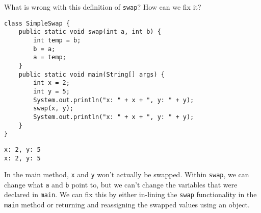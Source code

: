 \question What is wrong with this definition of \texttt{swap}? How can we fix it?

\begin{lstlisting}
class SimpleSwap {
    public static void swap(int a, int b) {
        int temp = b;
        b = a;
        a = temp;
    }
    public static void main(String[] args) {
        int x = 2;
        int y = 5;
        System.out.println("x: " + x + ", y: " + y);
        swap(x, y);
        System.out.println("x: " + x + ", y: " + y);
    }
}
\end{lstlisting}

\begin{solution}[0.25in]
\begin{verbatim}
x: 2, y: 5
x: 2, y: 5
\end{verbatim}
In the main method, \texttt{x} and \texttt{y} won't actually be swapped.
Within \texttt{swap}, we can change what \texttt{a} and \texttt{b} point to, but we can't change the variables that were declared in \texttt{main}. We can fix this by either in-lining the \texttt{swap} functionality in the \texttt{main} method or returning and reassigning the swapped values using an object.
\end{solution}